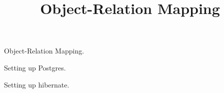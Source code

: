 \documentclass{beamer}
\title{Object-Relation Mapping}
\author{ }
\institute{Hogeschool Rotterdam \\ 
Rotterdam, Netherlands}
\date{}
\begin{document}
\maketitle

\begin{slide}{
\item Object-Relation Mapping.
\item Setting up Postgres.
\item Setting up hibernate.
}\end{slide}
\end{document}
